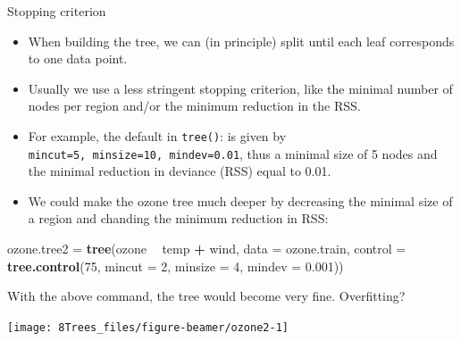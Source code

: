 \documentclass[10pt,ignorenonframetext,]{beamer}
\newenvironment{Shaded}{\begin{snugshade}}{\end{snugshade}}
\newcommand{\KeywordTok}[1]{\textcolor[rgb]{0.13,0.29,0.53}{\textbf{#1}}}
\newcommand{\DataTypeTok}[1]{\textcolor[rgb]{0.13,0.29,0.53}{#1}}
\newcommand{\DecValTok}[1]{\textcolor[rgb]{0.00,0.00,0.81}{#1}}
\newcommand{\FloatTok}[1]{\textcolor[rgb]{0.00,0.00,0.81}{#1}}
\newcommand{\StringTok}[1]{\textcolor[rgb]{0.31,0.60,0.02}{#1}}
\newcommand{\OperatorTok}[1]{\textcolor[rgb]{0.81,0.36,0.00}{\textbf{#1}}}
\newcommand{\NormalTok}[1]{#1}
\begin{document}
\begin{frame}[fragile]

\begin{block}{Stopping criterion}

\vspace{2mm}

\begin{itemize}
\item
  When building the tree, we can (in principle) split until each leaf
  corresponds to one data point.
\item
  Usually we use a less stringent stopping criterion, like the minimal
  number of nodes per region and/or the minimum reduction in the RSS.
\item
  For example, the default in \texttt{tree()}: is given by
  \texttt{mincut=5,\ minsize=10,\ mindev=0.01}, thus a minimal size of 5
  nodes and the minimal reduction in deviance (RSS) equal to 0.01.
\item
  We could make the ozone tree much deeper by decreasing the minimal
  size of a region and chanding the minimum reduction in RSS:
\end{itemize}

\scriptsize

\begin{Shaded}
\begin{Highlighting}[]
\NormalTok{ozone.tree2 =}\StringTok{ }\KeywordTok{tree}\NormalTok{(ozone }\OperatorTok{~}\StringTok{ }\NormalTok{temp }\OperatorTok{+}\StringTok{ }\NormalTok{wind, }\DataTypeTok{data =}\NormalTok{ ozone.train, }\DataTypeTok{control =} \KeywordTok{tree.control}\NormalTok{(}\DecValTok{75}\NormalTok{, }
    \DataTypeTok{mincut =} \DecValTok{2}\NormalTok{, }\DataTypeTok{minsize =} \DecValTok{4}\NormalTok{, }\DataTypeTok{mindev =} \FloatTok{0.001}\NormalTok{))}
\end{Highlighting}
\end{Shaded}

\end{block}

\end{frame}

\begin{frame}

With the above command, the tree would become very fine. Overfitting?

\begin{center}\texttt{[image: 8Trees\_files/figure-beamer/ozone2-1]} \end{center}

\end{frame}
\end{document}
